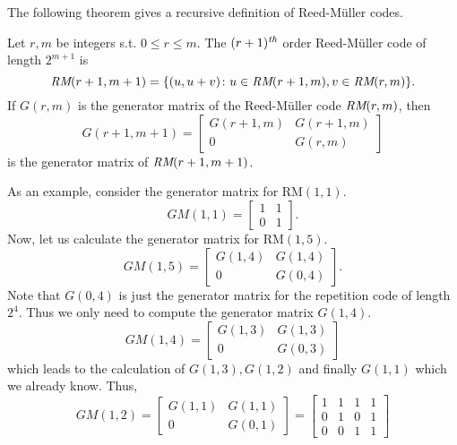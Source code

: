 \documentclass[english,bachelor]{liumaiex}
\begin{document}
The following theorem gives a recursive definition of Reed-M{\"u}ller codes.
\begin{thm}
Let $r,m$ be integers s.t. $0\leq r\leq m$. The $(r+1)^{\emph{th}}$ order Reed-M{\"u}ller code of length $2^{m+1}$ is
\begin{displaymath}
\emph{RM}(r+1,m+1)=\{(u,u+v)\colon u\in\emph{RM}(r+1,m),v\in\emph{RM}(r,m)\}.
\end{displaymath}
If $G(r,m)$ is the generator matrix of the Reed-M{\"u}ller code $\emph{RM}(r,m)$, then
\begin{displaymath}
G(r+1,m+1)=
\begin{bmatrix}
G(r+1,m) 	& G(r+1,m) \\
0			& G(r,m)
\end{bmatrix}
\end{displaymath}
is the generator matrix of $\emph{RM}(r+1,m+1)$.
\end{thm}
As an example, consider the generator matrix for $\textrm{RM}(1,1)$.
\begin{displaymath}
GM(1,1)=
\begin{bmatrix}
1 	& 1 \\
0	& 1
\end{bmatrix}.
\end{displaymath}
Now, let us calculate the generator matrix for $\textrm{RM}(1,5)$.
\begin{displaymath}
GM(1,5)=
\begin{bmatrix}
G(1,4) 	& G(1,4) \\
0		& G(0,4)
\end{bmatrix}.
\end{displaymath}
Note that $G(0,4)$ is just the generator matrix for the repetition code of length $2^4$. Thus we only need to compute the generator matrix $G(1,4)$.
\begin{displaymath}
GM(1,4)=
\begin{bmatrix}
G(1,3) 	& G(1,3) \\
0		& G(0,3)
\end{bmatrix}
\end{displaymath}
which leads to the calculation of $G(1,3), G(1,2)$ and finally $G(1,1)$ which we already know. Thus,
\begin{displaymath}
GM(1,2)=
\begin{bmatrix}
G(1,1) 	& G(1,1)\\
0		& G(0,1)
\end{bmatrix}
=
\begin{bmatrix}
1 & 1 & 1 & 1\\
0 & 1 & 0 & 1\\
0 & 0 & 1 & 1
\end{bmatrix}
\end{displaymath}
\end{document}
